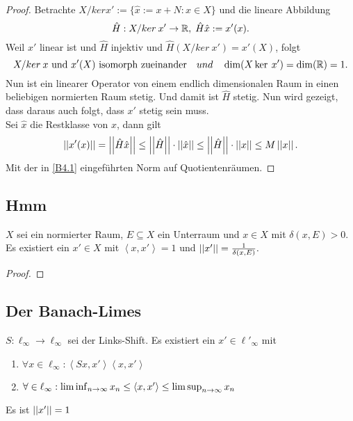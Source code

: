 \documentclass[FunkAnaskriptSS2017.tex]{subfiles}
\begin{document}
	\begin{proof}
		Betrachte $ X/ker x':= \{ \hat{x} := x + N: x\in X\} $ und die lineare Abbildung
			$$ \hat{H} : X/ker \:x' \to \mathbb{R}, \; \hat{H}\hat{x} := x'(x).$$
		Weil $x'$ linear ist und $\hat{H}$ injektiv und $\hat{H}(X/ker\: x') = x'(X)$, folgt
			$$X/ker\:x \text{ und } x'(X) \text{ isomorph zueinander} \quad und \quad \dim(X\ker \:x') = \dim(\mathbb{R}) = 1.$$ 
	Nun ist ein linearer Operator von einem endlich dimensionalen Raum in einen beliebigen normierten Raum stetig. Und damit ist $\hat{H}$ stetig. Nun wird gezeigt, dass daraus auch folgt, dass $x'$ stetig sein muss.\\
	Sei $\hat{x}$ die Restklasse von $x$, dann gilt 
		$$\left\lvert \left\lvert x'(x) \right\rvert \right\rvert = \left\lvert \left\lvert \hat{H}\hat{x} \right\rvert \right\rvert \leq \left\lvert \left\lvert \hat{H} \right\rvert \right\rvert \cdot \left\lvert \left\lvert \hat{x} \right\rvert \right\rvert \leq \left\lvert \left\lvert \hat{H} \right\rvert \right\rvert \cdot \left\lvert \left\lvert {x} \right\rvert \right\rvert \leq M \left\lvert \left\lvert x \right\rvert \right\rvert. $$ 
	Mit der in \ref{B4.1} eingeführten Norm auf Quotientenräumen.	
	\end{proof}
	


\subsection{ Hmm}
\label{B8.2}
	$X$ sei ein normierter Raum, $E\subseteq X$ ein Unterraum und $x\in X$ mit $\delta(x,E) > 0$. \\
	Es existiert ein $x'\in X$ mit $\left \langle x,x' \right \rangle = 1$ und $\left\lvert \left\lvert  x'  \right\rvert \right\rvert = \frac{1}{\delta(x,E)}.$
	
	\begin{proof}
	
	\end{proof}

\subsection{ Der Banach-Limes}
\label{B8.3}
	$S: \ell_\infty \to \ell_\infty$ sei der Links-Shift. Es existiert ein $x' \in \ell'_\infty$ mit
	\begin{enumerate}
		\item $\forall x \in \ell_\infty : \left \langle Sx, x' \right  \rangle \left \langle x,x' \right \rangle$
		\item $\forall \in \ell_\infty : \liminf_{n \to \infty} x_n \leq \left \langle x,x' \right \rangle \leq \limsup_{n\to\infty} x_n$
	\end{enumerate}
	Es ist $\left\lvert \left\lvert x' \right\rvert \right\rvert = 1$
	
	
\end{document}

